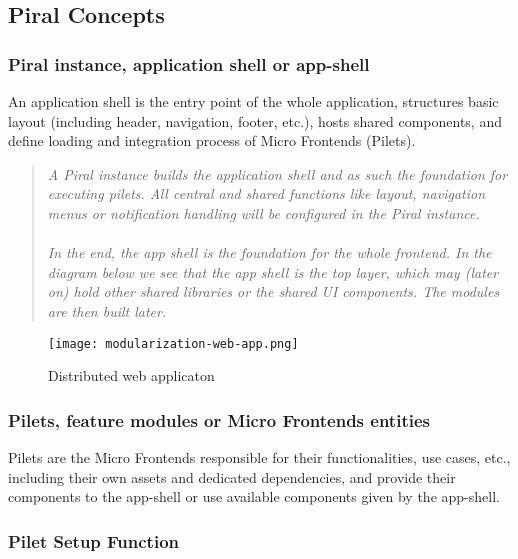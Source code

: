 \documentclass[a4paper]{book}
\begin{document}
\subsection{Piral Concepts}
\subsubsection{Piral instance, application shell or app-shell}

An application shell is the entry point of the whole application, structures basic layout (including header, navigation, footer, etc.), hosts shared components, and define loading and integration process of Micro Frontends (Pilets).

\begin{quote}
    \textit{A Piral instance builds the application shell and as such the foundation for executing pilets. All central and shared functions like layout, navigation menus or notification handling will be configured in the Piral instance.
\\ \\ 
In the end, the app shell is the foundation for the whole frontend. In the diagram below we see that the app shell is the top layer, which may (later on) hold other shared libraries or the shared UI components. The modules are then built later.} \cite{PiralGettingStarted}
\end{quote}

\begin{figure}[h!]
  \centering
  \captionsetup{justification=centering}
  \texttt{[image: modularization-web-app.png]}
  \caption{Distributed web applicaton \cite{PiralGettingStarted}}
  \label{fig:7}
\end{figure}

\subsubsection{Pilets, feature modules or Micro Frontends entities }

Pilets are the Micro Frontends responsible for their functionalities, use cases, etc., including their own assets and dedicated dependencies, and provide their components to the app-shell or use available components given by the app-shell.

\subsubsection{Pilet Setup Function}
\end{document}
